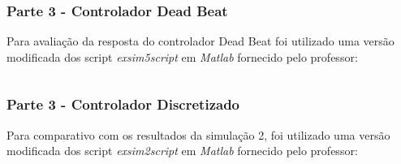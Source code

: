 \documentclass[a4paper,11pt]{article}
\begin{document}
\inputminted[xleftmargin=15pt,linenos,frame=single,framesep=5pt,breaklines=true]{matlab}{../matlab/exsim5/exsim5.m}

\newpage
\subsubsection*{Parte 3 - Controlador Dead Beat}
Para avaliação da resposta do controlador Dead Beat foi utilizado uma versão modificada dos script \textit{exsim5script} em \textit{Matlab} fornecido pelo professor:
\inputminted[xleftmargin=15pt,linenos,frame=single,framesep=5pt,breaklines=true]{matlab}{../matlab/exsim5/exsim5script.m}

\newpage
\subsubsection*{Parte 3 - Controlador Discretizado}
Para comparativo com os resultados da simulação 2, foi utilizado uma versão modificada dos script \textit{exsim2script} em \textit{Matlab} fornecido pelo professor:
\inputminted[xleftmargin=15pt,linenos,frame=single,framesep=5pt,breaklines=true]{matlab}{../matlab/exsim5/exsim2script.m}



\end{document}
